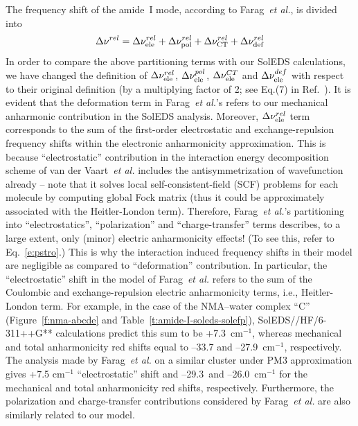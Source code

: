 \documentclass[b5paper,oneside,fleqn,11pt]{book}
\begin{document}
\begin{refsection}
The frequency shift of the amide~I mode, according to Farag~\emph{et al.}, is divided into
%
\begin{equation} \label{e:cooo2}
 \Delta\nu^{rel} =  \Delta\nu_{\rm ele}^{rel} +
                    \Delta\nu_{\rm pol}^{rel} +
                    \Delta\nu_{\rm CT}^{rel} +
                    \Delta\nu_{\rm def}^{rel}
\end{equation}
%
In order to compare the above partitioning terms with our SolEDS calculations, we have
changed the definition of $\Delta\nu_{\rm ele}^{rel}$, $\Delta\nu_{\rm ele}^{pol}$,
$\Delta\nu_{\rm ele}^{CT}$ and $\Delta\nu_{\rm ele}^{def}$ with respect to their 
original definition (by a multiplying factor of 2; see Eq.(7) 
in Ref.~\citep{Farag.Ruiz-Lopez.Bastida.Monard.Ingrosso.JPCB.2015}). 
It is evident that the deformation term in Farag~\emph{et al.}'s 
refers to our mechanical anharmonic contribution in the SolEDS analysis.
Moreover, $\Delta\nu_{\rm ele}^{rel}$ term corresponds to the sum of the 
first\hyp{}order electrostatic and exchange\hyp{}repulsion frequency shifts 
within the electronic anharmonicity approximation. This is because 
``electrostatic'' contribution in the interaction energy decomposition 
scheme of van der Vaart~\emph{et al.} \citep{vanderVaart.Merz.JPCA.1999}  
includes the antisymmetrization of wavefunction 
already -- note that it solves local self\hyp{}consistent\hyp{}field (SCF) 
problems for each molecule by computing global Fock matrix 
(thus it could be approximately associated with the Heitler\hyp{}London term). 
Therefore, Farag~\emph{et al.}'s partitioning into
``electrostatics'', ``polarization'' and ``charge\hyp{}transfer” terms
describes, to a large extent, only (minor) electric anharmonicity
effects! (To see this, refer to Eq.~\eqref{e:pstro}.) This is
why the interaction induced frequency shifts in their model
are negligible as compared to ``deformation'' contribution.
In particular, the ``electrostatic'' shift in the model of Farag~\emph{et al.}
refers to the sum of the Coulombic and exchange\hyp{}repulsion
electric anharmonicity terms, i.e., Heitler\hyp{}London
term. For example, in the case of the NMA--water complex ``C''
(Figure~\ref{f:nma-abcde} and Table~\ref{t:amide-I-soleds-solefp}), 
SolEDS//HF/6-311++G** calculations predict
this sum to be +7.3~cm$^{-1}$, whereas mechanical and total
anharmonicity red shifts equal to --33.7 and --27.9~cm$^{-1}$,
respectively. The analysis made by Farag~\emph{et al.} on a similar
cluster under PM3 approximation \citep{Stewart.JCC.1988} 
gives +7.5 cm$^{-1}$ ``electrostatic''
shift and --29.3~and --26.0~cm$^{-1}$ for the mechanical and
total anharmonicity red shifts, respectively. Furthermore, the
polarization and charge\hyp{}transfer contributions considered by
Farag~\emph{et al.} are also similarly related to our model. 


\end{refsection}
\end{document}
